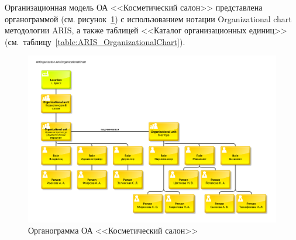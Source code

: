 Организационная модель ОА <<Косметический салон>> представлена органограммой
(см. рисунок~\ref{fig:ArisOrganizationalChart_AllOrganization})
с использованием нотации Organizational chart методологии ARIS,
а также таблицей <<Каталог организационных единиц>>
(см.~таблицу~\ref{table:ARIS_OrganizationalChart}).

\begin{figure}[!h]
    \centering
    \includegraphics[width=16cm]
        {assets/ARIS/OrganizationalChart/AllOrganization.ArisOrganizationalChart.pdf}
    \caption{Органограмма ОА <<Косметический салон>>}
    \label{fig:ArisOrganizationalChart_AllOrganization}
\end{figure}

